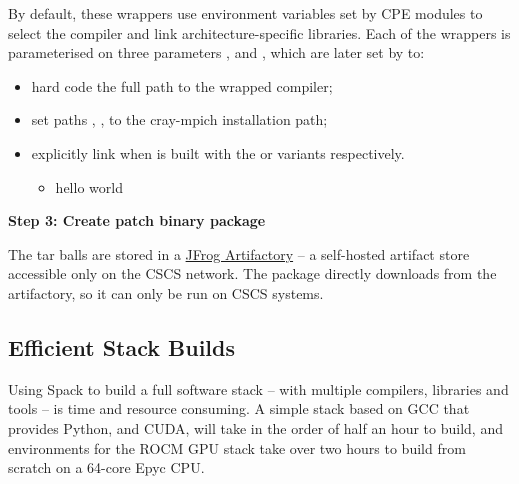 By default, these wrappers use environment variables set by CPE modules to select the compiler and link architecture-specific libraries.
Each of the wrappers is parameterised on three parameters ,  and , which are later set by \spack to:
\begin{itemize}
    \item hard code the full path to the wrapped compiler;
    \item set paths , , to the cray-mpich \spack installation path;
    \item explicitly link   when \craympich is built with the  or  variants respectively.
    \begin{itemize}
        \item hello world
    \end{itemize}
\end{itemize}


\noindent\textbf{Step 3: Create patch binary \spack package}

The tar balls are stored in a \href{https://jfrog.com/artifactory/}{JFrog Artifactory} -- a self-hosted artifact store accessible only on the CSCS network.
The \spack package directly downloads from the artifactory, so it can only be run on CSCS systems.

\href{https://github.com/eth-cscs/stackinator/blob/master/stackinator/repo/packages/cray-mpich/package.py}{}

\subsection{Efficient Stack Builds}
\label{sec:faster-builds}

Using Spack to build a full software stack -- with multiple compilers, libraries and tools -- is time and resource consuming.
A simple stack based on GCC that provides Python, \craympich and CUDA, will take in the order of half an hour to build, and environments for the ROCM GPU stack take over two hours to build from scratch on a 64-core Epyc CPU.

